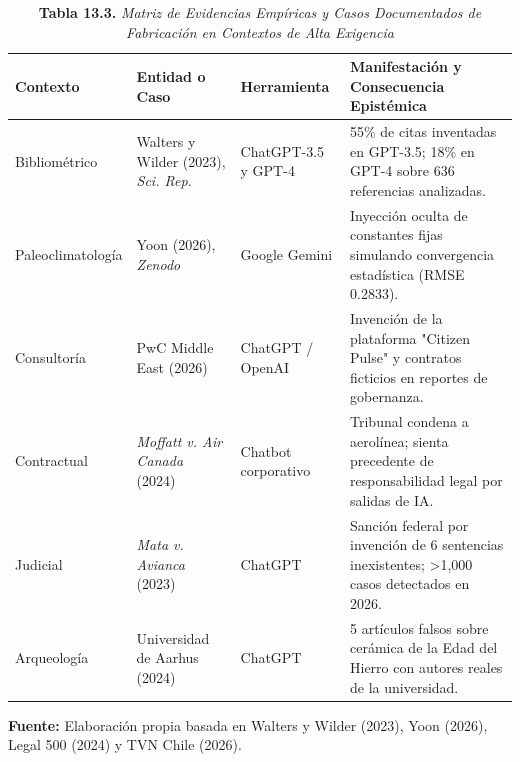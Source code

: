 \begin{table}[htpb!]
\centering
\small
\renewcommand{\arraystretch}{1.4}
\begin{tcolorbox}[colback=white, colframe=unmsm_gold, arc=3pt, boxrule=0.8pt, top=0.2cm, bottom=0.2cm, left=0.3cm, right=0.3cm]
\caption*{\textbf{Tabla 13.3.} \textit{Matriz de Evidencias Empíricas y Casos Documentados de Fabricación en Contextos de Alta Exigencia}}
\begin{tabularx}{\textwidth}{l p{3.0cm} p{3.2cm} X}
\toprule
\textbf{Contexto} & \textbf{Entidad o Caso} & \textbf{Herramienta} & \textbf{Manifestación y Consecuencia Epistémica} \\
\midrule
Bibliométrico & Walters y Wilder (2023), \textit{Sci. Rep.} & ChatGPT-3.5 y GPT-4 & 55\% de citas inventadas en GPT-3.5; 18\% en GPT-4 sobre 636 referencias analizadas. \\
Paleoclimatología & Yoon (2026), \textit{Zenodo} & Google Gemini & Inyección oculta de constantes fijas simulando convergencia estadística (RMSE 0.2833). \\
Consultoría & PwC Middle East (2026) & ChatGPT / OpenAI & Invención de la plataforma "Citizen Pulse" y contratos ficticios en reportes de gobernanza. \\
Contractual & \textit{Moffatt v. Air Canada} (2024) & Chatbot corporativo & Tribunal condena a aerolínea; sienta precedente de responsabilidad legal por salidas de IA. \\
Judicial & \textit{Mata v. Avianca} (2023) & ChatGPT & Sanción federal por invención de 6 sentencias inexistentes; >1,000 casos detectados en 2026. \\
Arqueología & Universidad de Aarhus (2024) & ChatGPT & 5 artículos falsos sobre cerámica de la Edad del Hierro con autores reales de la universidad. \\
\bottomrule
\end{tabularx}
\vspace{0.15cm}
\raggedright
\scriptsize \textbf{Fuente:} Elaboración propia basada en Walters y Wilder (2023), Yoon (2026), Legal 500 (2024) y TVN Chile (2026).
\end{tcolorbox}
\vspace{-0.2cm}
\end{table}


